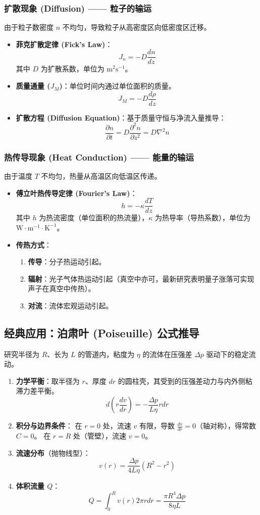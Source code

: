 \documentclass{article}
\begin{document}
\subsubsection{扩散现象 (Diffusion) —— 粒子的输运}
由于粒子数密度 $n$ 不均匀，导致粒子从高密度区向低密度区迁移。
\begin{itemize}
    \item \textbf{菲克扩散定律 (Fick's Law)}：
    \[ J_n = -D \frac{dn}{dz} \]
    其中 $D$ 为扩散系数，单位为 $\text{m}^2 \text{s}^{-1}$。
    \item \textbf{质量通量 ($J_M$)}：单位时间内通过单位面积的质量。
    \[ J_M = -D \frac{d\rho}{dz} \]
    \item \textbf{扩散方程 (Diffusion Equation)}：基于质量守恒与净流入量推导：
    \[ \frac{\partial n}{\partial t} = D \frac{\partial^2 n}{\partial z^2} = D \nabla^2 n \]
\end{itemize}

\subsubsection{热传导现象 (Heat Conduction) —— 能量的输运}
由于温度 $T$ 不均匀，热量从高温区向低温区传递。
\begin{itemize}
    \item \textbf{傅立叶热传导定律 (Fourier's Law)}：
    \[ h = -\kappa \frac{dT}{dz} \]
    其中 $h$ 为热流密度（单位面积的热流量），$\kappa$ 为热导率（导热系数），单位为 $\text{W} \cdot \text{m}^{-1} \cdot \text{K}^{-1}$。
    \item \textbf{传热方式}：
    \begin{enumerate}
        \item \textbf{传导}：分子热运动引起。
        \item \textbf{辐射}：光子气体热运动引起（真空中亦可，最新研究表明量子涨落可实现声子在真空中传热）。
        \item \textbf{对流}：流体宏观运动引起。
    \end{enumerate}
\end{itemize}

\subsection{经典应用：泊肃叶 (Poiseuille) 公式推导}
研究半径为 $R$、长为 $L$ 的管道内，粘度为 $\eta$ 的流体在压强差 $\Delta p$ 驱动下的稳定流动。
\begin{enumerate}
    \item \textbf{力学平衡}：取半径为 $r$、厚度 $dr$ 的圆柱壳，其受到的压强差动力与内外侧粘滞力差平衡。
    \[ d\left( r \frac{dv}{dr} \right) = -\frac{\Delta p}{L\eta} r dr \]
    \item \textbf{积分与边界条件}：
    在 $r=0$ 处，流速 $v$ 有限，导数 $\frac{dv}{dr}=0$（轴对称），得常数 $C=0$。
    在 $r=R$ 处（管壁），流速 $v=0$。
    \item \textbf{流速分布}（抛物线型）：
    \[ v(r) = \frac{\Delta p}{4L\eta} (R^2 - r^2) \]
    \item \textbf{体积流量 $Q$}：
    \[ Q = \int_0^R v(r) 2\pi r dr = \frac{\pi R^4 \Delta p}{8\eta L} \]
\end{enumerate}
\end{document}
